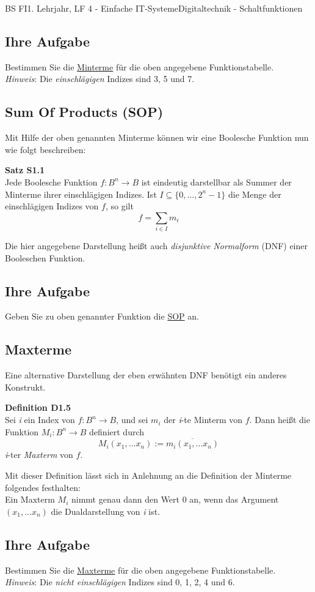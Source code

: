 \documentclass[11pt,twocolumn,oneside,openany,headings=optiontotoc,11pt,numbers=noenddot]{article}
\begin{document}
\begin{worksheet}{BS FI}{1. Lehrjahr, LF 4 - Einfache IT-Systeme}{Digitaltechnik - Schaltfunktionen}
		\subsection*{Ihre Aufgabe} Bestimmen Sie die \underline{Minterme} für die oben angegebene Funktionstabelle.\\
		\textit{Hinweis}: Die \textit{einschlägigen} Indizes sind 3, 5 und 7.
		\subsection{Sum Of Products (SOP)} Mit Hilfe der oben genannten Minterme können wir eine Boolesche Funktion nun wie folgt beschreiben:
		\begin{framed}
			\textbf{Satz S1.1}\\ Jede Boolesche Funktion \(f: B^n \rightarrow B\) ist eindeutig darstellbar als Summer der Minterme ihrer einschlägigen Indizes. Ist \(I \subseteq \{0,\ldots , 2^n -1\}\) die Menge der einschlägigen Indizes von \(f\), so gilt
			\[f = \sum_{i\in I} m_i\]
		\end{framed}
		Die hier angegebene Darstellung heißt auch \textit{disjunktive Normalform} (DNF) einer Booleschen Funktion.
		\subsection*{Ihre Aufgabe} Geben Sie zu oben genannter Funktion die \underline{SOP} an.
		\subsection{Maxterme} Eine alternative Darstellung der eben erwähnten DNF benötigt ein anderes Konstrukt.
		\begin{framed}
			\textbf{Definition D1.5}\\Sei \textit{i} ein Index von \(f:B^n\rightarrow B\), und sei \(m_i\) der \textit{i}-te Minterm von \(f\). Dann heißt die Funktion \(M_i: B^n \rightarrow B\) definiert durch
			\[M_i(x_1,\ldots x_n) := \overline{m_i(x_1,\ldots x_n)}\]
			\textit{i}-ter \textit{Maxterm} von \(f\).
		\end{framed}
		Mit dieser Definition lässt sich in Anlehnung an die Definition der Minterme folgendes festhalten:\\ Ein Maxterm \(M_i\) nimmt genau dann den Wert 0 an, wenn das Argument \((x_1,\ldots x_n)\) die Dualdarstellung von \textit{i} ist.
		\subsection*{Ihre Aufgabe} Bestimmen Sie die \underline{Maxterme} für die oben angegebene Funktionstabelle.\\
		\textit{Hinweis}: Die \textit{nicht einschlägigen} Indizes sind 0, 1, 2, 4 und 6.

\end{worksheet}
\end{document}
